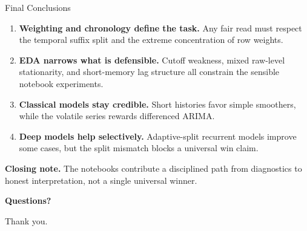 \begin{frame}[t]{Final Conclusions}
  \vspace{0.4em}

  \begin{panelbox}
    \small
    \begin{enumerate}
      \item \textbf{Weighting and chronology define the task.} Any fair read must respect the temporal suffix split and the extreme concentration of row weights.
      \item \textbf{EDA narrows what is defensible.} Cutoff weakness, mixed raw-level stationarity, and short-memory lag structure all constrain the sensible notebook experiments.
      \item \textbf{Classical models stay credible.} Short histories favor simple smoothers, while the volatile series rewards differenced ARIMA.
      \item \textbf{Deep models help selectively.} Adaptive-split recurrent models improve some cases, but the split mismatch blocks a universal win claim.
    \end{enumerate}
  \end{panelbox}
  \vspace{0.15em}
  {\small\color{DeckMuted}\textbf{Closing note.} The notebooks contribute a disciplined path from diagnostics to honest interpretation, not a single universal winner.}
\end{frame}

\begin{frame}[plain]
  \vfill
  \begin{center}
    {\fontsize{28}{32}\selectfont\bfseries Questions?\par}
    \vspace{0.5em}
    {\large\color{DeckMuted}Thank you.}
  \end{center}
  \vfill
\end{frame}
